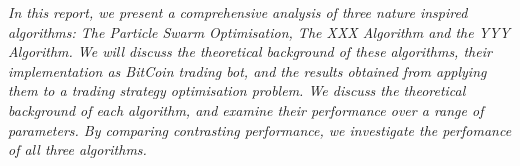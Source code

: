 \textit{In this report, we present a comprehensive analysis of three nature inspired algorithms: The Particle Swarm Optimisation, The XXX Algorithm and the YYY Algorithm. 
We will discuss the theoretical background of these algorithms, their implementation as BitCoin trading bot,  and the results obtained from applying them to a
trading strategy optimisation problem. We discuss the theoretical background of each algorithm, and examine their performance over a range of parameters. By comparing 
contrasting performance, we investigate the perfomance of all three algorithms.}